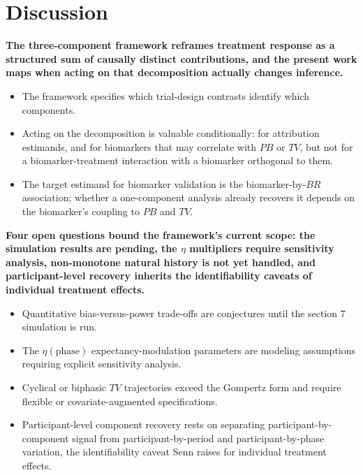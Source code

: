 \documentclass[
  11pt,
]{article}
\begin{document}
\section{Discussion}\label{discussion}

\textbf{The three-component framework reframes treatment response as a structured sum of causally distinct contributions, and the present work maps when acting on that decomposition actually changes inference.}

\begin{itemize}\setlength{\itemsep}{2pt}\setlength{\parskip}{0pt}
\item The framework specifies which trial-design contrasts identify which components.
\item Acting on the decomposition is valuable conditionally: for attribution estimands, and for biomarkers that may correlate with $PB$ or $TV$, but not for a biomarker-treatment interaction with a biomarker orthogonal to them.
\item The target estimand for biomarker validation is the biomarker-by-$BR$ association; whether a one-component analysis already recovers it depends on the biomarker's coupling to $PB$ and $TV$.
\end{itemize}

\textbf{Four open questions bound the framework's current scope: the simulation results are pending, the $\eta$ multipliers require sensitivity analysis, non-monotone natural history is not yet handled, and participant-level recovery inherits the identifiability caveats of individual treatment effects.}

\begin{itemize}\setlength{\itemsep}{2pt}\setlength{\parskip}{0pt}
\item Quantitative bias-versus-power trade-offs are conjectures until the section 7 simulation is run.
\item The $\eta(\text{phase})$ expectancy-modulation parameters are modeling assumptions requiring explicit sensitivity analysis.
\item Cyclical or biphasic $TV$ trajectories exceed the Gompertz form and require flexible or covariate-augmented specifications.
\item Participant-level component recovery rests on separating participant-by-component signal from participant-by-period and participant-by-phase variation, the identifiability caveat Senn raises for individual treatment effects.
\end{itemize}
\end{document}
